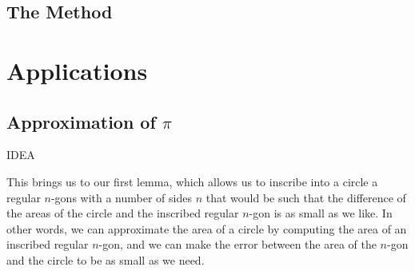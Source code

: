 \documentclass[letterpaper, 12pt]{amsart}
\theoremstyle{definition}  %
\begin{document}
		\subsection{The Method}
		\label{sub:the_method}
	\newpage

	\section{Applications}
	\label{sec:applications}
		\subsection{Approximation of $\pi$}
		\label{sub:approximation_of_pi}
		IDEA

		This brings us to our first lemma, which allows us to inscribe into a circle a regular $n$-gons with a number of sides $n$ that would be such that the difference of the areas of the circle and the inscribed regular $n$-gon is as small as we like.
		In other words, we can approximate the area of a circle by computing the area of an inscribed regular $n$-gon, and we can make the error between the area of the $n$-gon and the circle to be as small as we need.
\end{document}

